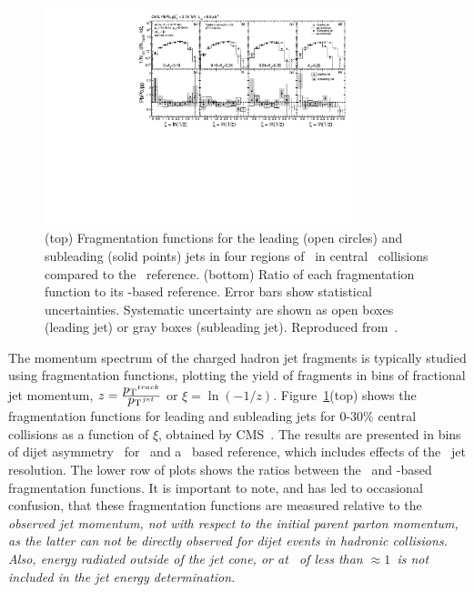 \begin{figure}[!ht]
\begin{center}
\includegraphics[width=0.8\textwidth]{jetfigures/xsi_div_both_effv9_l100s40_0to12_dphi20eta20dr3pt4id1_cwt_ppDiv_gray.pdf}
\caption{(top) Fragmentation functions for the leading (open circles) and subleading (solid points) 
jets in four regions of \AJ\ in central \PbPb\ collisions compared to the \pp\ reference.
(bottom) Ratio of each fragmentation function to its \pp-based reference.
Error bars show statistical uncertainties. Systematic uncertainty are 
shown as open boxes (leading jet) or gray boxes (subleading jet).
Reproduced from~\cite{Chatrchyan:2012gw}.
}

\label{fig:GR:CMS_jetFF}
\end{center}
\end{figure}
The momentum spectrum of the charged hadron jet fragments is typically 
studied using fragmentation functions, plotting the yield of fragments
in bins of fractional jet momentum, $z = \frac{\mbox{$p_{\mathrm{T}}$}^{track}}{\mbox{$p_{\mathrm{T}}$}^{jet}}$ or 
$\xi = \ln(-1/z)$. 
Figure~\ref{fig:GR:CMS_jetFF}(top) shows the fragmentation functions 
for leading and subleading jets for 0-30\% central collisions as a function
of $\xi$, obtained
by CMS~\cite{Chatrchyan:2012gw}. The results are presented in bins of 
dijet asymmetry \AJ\ for \PbPb\ and a \pp\ based reference,
which includes effects of the \PbPb\ jet resolution.
The lower row of plots shows the ratios between the \PbPb\
and \pp-based fragmentation functions. It is important to note, and has 
led to occasional confusion, that these fragmentation functions are 
measured relative to the \em observed \em jet momentum, not with respect
to the initial parent parton momentum, as the latter can not be directly observed
for dijet events in hadronic collisions.
Also, energy radiated outside of the jet cone, or at \pT\ of less than $\approx 1$\GeVc\
is not included in the jet energy determination.

